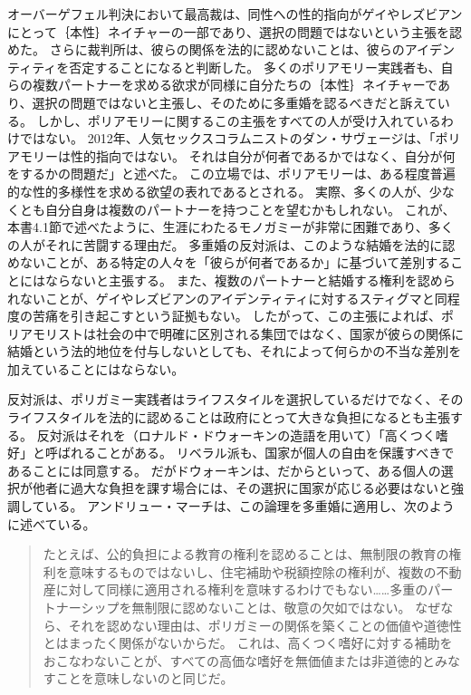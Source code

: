 \documentclass[paper=a4,book,openany]{jlreq}
\newcommand{\ig}[1]{}           %
\begin{document}
オーバーゲフェル判決において最高裁は、同性への性的指向がゲイやレズビアンにとって｛本性｝{ネイチャー}の一部であり、選択の問題ではないという主張を認めた。
さらに裁判所は、彼らの関係を法的に認めないことは、彼らのアイデンティティを否定することになると判断した。
多くのポリアモリー実践者も、自らの複数パートナーを求める欲求が同様に自分たちの｛本性｝{ネイチャー}であり、選択の問題ではないと主張し、そのために多重婚を認るべきだと訴えている。
しかし、ポリアモリーに関するこの主張をすべての人が受け入れているわけではない。
2012年、人気セックスコラムニストのダン・サヴェージは、「ポリアモリーは性的指向ではない。
それは自分が何者であるかではなく、自分が何をするかの問題だ」と述べた\citep{savage12:_savag_busted}。
この立場では、ポリアモリーは、ある程度普遍的な性的多様性を求める欲望の表れであるとされる。
実際、多くの人が、少なくとも自分自身は複数のパートナーを持つことを望むかもしれない。
これが、本書4.1節で述べたように、生涯にわたるモノガミーが非常に困難であり、多くの人がそれに苦闘する理由だ。
多重婚の反対派は、このような結婚を法的に認めないことが、ある特定の人々を「彼らが何者であるか」に基づいて差別することにはならないと主張する。
また、複数のパートナーと結婚する権利を認められないことが、ゲイやレズビアンのアイデンティティに対するスティグマと同程度の苦痛を引き起こすという証拠もない。
したがって、この主張によれば、ポリアモリストは社会の中で明確に区別される集団ではなく、国家が彼らの関係に結婚という法的地位を付与しないとしても、それによって何らかの不当な差別を加えていることにはならない。

反対派は、ポリガミー実践者はライフスタイルを選択しているだけでなく、そのライフスタイルを法的に認めることは政府にとって大きな負担になるとも主張する。
反対派はそれを（ロナルド・ドウォーキン\ig{Ronald Dworkin}の造語を用いて）「高くつく嗜好」と呼ばれることがある。
リベラル派も、国家が個人の自由を保護すべきであることには同意する。
だがドウォーキンは、だからといって、ある個人の選択が他者に過大な負担を課す場合には、その選択に国家が応じる必要はないと強調している\citep[p.229]{dworkin81:_what_is_equal}。
アンドリュー・マーチは、この論理を多重婚に適用し、次のように述べている。

\begin{quote}
たとえば、公的負担による教育の権利を認めることは、無制限の教育の権利を意味するものではないし、住宅補助や税額控除の権利が、複数の不動産に対して同様に適用される権利を意味するわけでもない……多重のパートナーシップを無制限に認めないことは、敬意の欠如ではない。
なぜなら、それを認めない理由は、ポリガミーの関係を築くことの価値や道徳性とはまったく関係がないからだ。
これは、高くつく嗜好に対する補助をおこなわないことが、すべての高価な嗜好を無価値または非道徳的とみなすことを意味しないのと同じだ。
\citep[p.249]{march11:_is_there_right_polyg}
\end{quote}
\end{document}
